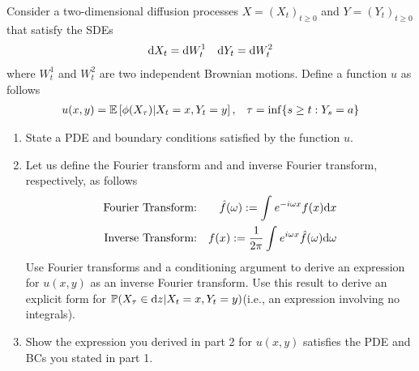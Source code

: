 \documentclass[10pt]{article}
\begin{document}
\begin{problem}[Exercise 9.6]
    Consider a two-dimensional diffusion processes \( X = (X_t)_{t\geq 0} \) and \( Y = (Y_t)_{t\geq 0} \) that satisfy the SDEs
    \begin{align*}
        \mathrm{d} X_t = \mathrm{d} W_t^1 && \mathrm{d} Y_t = \mathrm{d} W_t^2
    \end{align*}
    where \( W_t^1 \) and \( W_t^2 \) are two independent Brownian motions. Define a function \( u \) as follows
    \begin{align*}
        u(x,y) = \mathbb{E} \left[ \phi(X_\tau) | X_t = x, Y_t = y \right], && \tau = \inf\{ s\geq t:Y_s = a \}
    \end{align*}
   
    \begin{enumerate}
        \item State a PDE and boundary conditions satisfied by the function \( u \).
        \item Let us define the Fourier transform and and inverse Fourier transform, respectively, as follows
            \begin{align*}
                \text{Fourier Transform:} && \hat{f}(\omega):= \int_{}^{}e^{-i\omega x}f(x) \mathrm{d} x \\
                \text{Inverse Transform:} && f(x):= \dfrac{1}{2\pi}\int_{}^{}e^{i\omega x}\hat{f}(\omega) \mathrm{d} \omega 
            \end{align*}
        Use Fourier transforms and a conditioning argument to derive an expression for \( u(x,y) \) as an inverse Fourier transform. Use this result to derive an explicit form for \( \mathbb{P}(X_\tau \in \mathrm{d} z |X_t=x,Y_t=y) \)(i.e., an expression involving no integrals).
    \item Show the expression you derived in part 2 for \( u(x,y) \) satisfies the PDE and BCs you stated in part 1.
    \end{enumerate} 
\end{problem}
\end{document}
